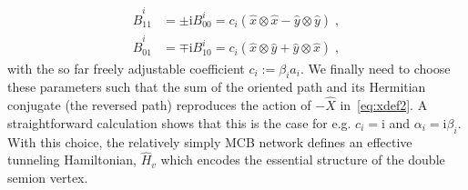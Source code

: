 \documentclass[twocolumn,floats,prx,showpacs]{revtex4-1}
\begin{document}
\begin{align}
\hat B^i_{11}&=\pm \mathrm{i}B^i_{00}=  c_i(  \hat x \otimes \hat x -  \hat y \otimes \hat y)  \;, \label{eq:B} \\
\hat B^i_{01}&=\mp\mathrm{i}B^i_{10}= c_i(\hat x \otimes \hat y + \hat y \otimes \hat x)  \;, \nonumber
\end{align}
with the so far freely adjustable coefficient $c_i:=  \beta_i a_i$. We finally need to choose these parameters such that the sum of the oriented path and its Hermitian conjugate (the reversed path) reproduces the action of $-\hat X$ in~\eqref{eq:xdef2}. A straightforward calculation shows that this is the case for e.g. $c_i =\mathrm{i}$ and $\alpha_i=\mathrm i \beta_i$. With this choice, the relatively simply MCB network defines an effective  tunneling Hamiltonian, $\hat H_v$ which  encodes the essential structure of the double semion vertex.   
\end{document}
